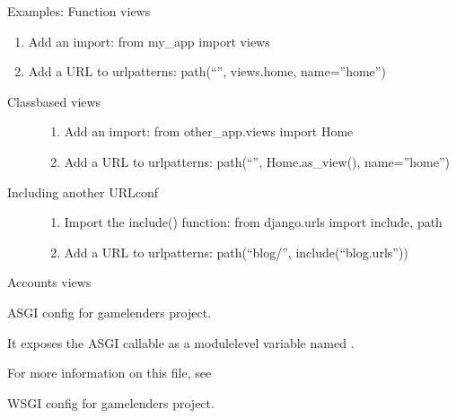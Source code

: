 \documentclass[letterpaper,10pt,french]{sphinxmanual}
\begin{document}
Examples:
Function views
\begin{enumerate}
%
\item {}
Add an import:  from my\_app import views

\item {}
Add a URL to urlpatterns:  path(“”, views.home, name=”home”)

\end{enumerate}
\begin{description}
\item[{Class\sphinxhyphen{}based views}] \leavevmode\begin{enumerate}
%
\item {}
Add an import:  from other\_app.views import Home

\item {}
Add a URL to urlpatterns:  path(“”, Home.as\_view(), name=”home”)

\end{enumerate}

\item[{Including another URLconf}] \leavevmode\begin{enumerate}
%
\item {}
Import the include() function: from django.urls import include, path

\item {}
Add a URL to urlpatterns:  path(“blog/”, include(“blog.urls”))

\end{enumerate}

\end{description}
\label{\detokenize{gamelenders:module-gamelenders.views}}
Accounts views

\label{\detokenize{gamelenders:module-gamelenders.asgi}}
ASGI config for gamelenders project.

It exposes the ASGI callable as a module\sphinxhyphen{}level variable named .

For more information on this file, see

\label{\detokenize{gamelenders:module-gamelenders.wsgi}}
WSGI config for gamelenders project.
\end{document}
